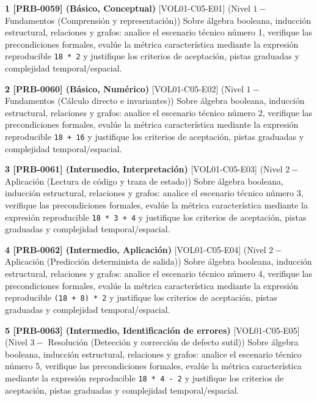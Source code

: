 \documentclass{book}
\begin{document}
\begin{tcolorbox}[title={Ejercicios}, studiumworked, breakable]

\noindent\textbf{1 [PRB-0059] (Básico, Conceptual)}
[VOL01-C05-E01] (Nivel \(1 -\) Fundamentos (Comprensión y representación)) Sobre álgebra booleana, inducción estructural, relaciones y grafos: analice el escenario técnico número 1, verifique las precondiciones formales, evalúe la métrica característica mediante la expresión reproducible \texttt{18 * 2} y justifique los criterios de aceptación, pistas graduadas y complejidad temporal/espacial.

\noindent\textbf{2 [PRB-0060] (Básico, Numérico)}
[VOL01-C05-E02] (Nivel \(1 -\) Fundamentos (Cálculo directo e invariantes)) Sobre álgebra booleana, inducción estructural, relaciones y grafos: analice el escenario técnico número 2, verifique las precondiciones formales, evalúe la métrica característica mediante la expresión reproducible \texttt{18 + 16} y justifique los criterios de aceptación, pistas graduadas y complejidad temporal/espacial.

\noindent\textbf{3 [PRB-0061] (Intermedio, Interpretación)}
[VOL01-C05-E03] (Nivel \(2 -\) Aplicación (Lectura de código y traza de estado)) Sobre álgebra booleana, inducción estructural, relaciones y grafos: analice el escenario técnico número 3, verifique las precondiciones formales, evalúe la métrica característica mediante la expresión reproducible \texttt{18 * 3 + 4} y justifique los criterios de aceptación, pistas graduadas y complejidad temporal/espacial.

\noindent\textbf{4 [PRB-0062] (Intermedio, Aplicación)}
[VOL01-C05-E04] (Nivel \(2 -\) Aplicación (Predicción determinista de salida)) Sobre álgebra booleana, inducción estructural, relaciones y grafos: analice el escenario técnico número 4, verifique las precondiciones formales, evalúe la métrica característica mediante la expresión reproducible \texttt{(18 + 8) * 2} y justifique los criterios de aceptación, pistas graduadas y complejidad temporal/espacial.

\noindent\textbf{5 [PRB-0063] (Intermedio, Identificación de errores)}
[VOL01-C05-E05] (Nivel \(3 -\) Resolución (Detección y corrección de defecto sutil)) Sobre álgebra booleana, inducción estructural, relaciones y grafos: analice el escenario técnico número 5, verifique las precondiciones formales, evalúe la métrica característica mediante la expresión reproducible \texttt{18 * 4 - 2} y justifique los criterios de aceptación, pistas graduadas y complejidad temporal/espacial.


\end{tcolorbox}
\end{document}
